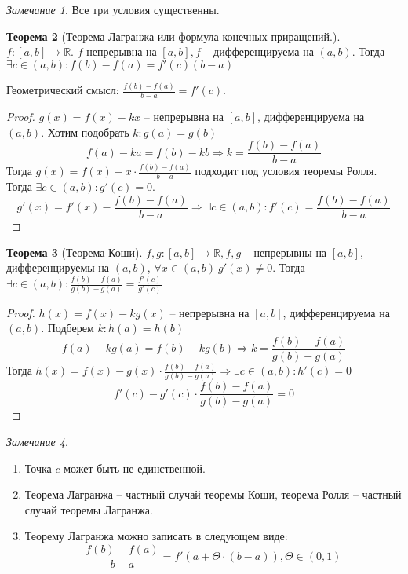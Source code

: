 \documentclass[12pt]{article}
\newenvironment{MyList}[1][4pt]{
  \begin{enumerate}[1.]
  \setlength{\parskip}{0pt}
  \setlength{\itemsep}{#1}
}{       
  \end{enumerate}
}
\def\R{\mathbb{R}}       %
\def\SO{\Rightarrow}     %
\theoremstyle{definition} %
\newtheorem{Thm}{\underline{Теорема}}[subsection] %
\theoremstyle{plain} %
\theoremstyle{remark} %
\newtheorem{Rem}[Thm]{Замечание} %
\begin{document}
\begin{Rem}
    Все три условия существенны.
\end{Rem}

\begin{Thm}[Теорема Лагранжа или формула конечных приращений.]
    $f : [a, b] \to \R$. $f$ непрерывна на $[a, b], f$ -- дифференцируема на $(a, b)$.
    Тогда $\exists c \in (a, b) : f(b) - f(a) = f'(c)(b - a)$ 

    Геометрический смысл: $ \frac{f(b) - f(a)}{b - a} = f'(c)$.
    
    \begin{figure*}[h]
        \centering
        \def\svgwidth{0.4\columnwidth} 
        
        \caption{Теорема Лагранжа}
    \end{figure*}
\end{Thm}

\begin{proof}
    $g(x) = f(x) - kx$ -- непрерывна на $[a, b]$, дифференцируема на $(a, b)$. Хотим подобрать $k : g(a) = g(b)$
    \[f(a) - ka = f(b) - kb \SO k = \frac{f(b) - f(a)}{b - a}\]
    Тогда $g(x) = f(x) - x \cdot \frac{f(b) - f(a)}{b - a}$ подходит под условия теоремы Ролля.
    Тогда $\exists c \in (a, b) : g'(c) = 0$.
    \[g'(x) = f'(x) - \frac{f(b) - f(a)}{b - a} \SO \exists c \in (a, b) : f'(c) = \frac{f(b) - f(a)}{b - a}\]  
\end{proof}

\begin{Thm}[Теорема Коши]
    $f, g : [a, b] \to \R, f, g$ -- непрерывны на $[a, b]$, дифференцируемы на $(a, b)$, $\forall x \in (a, b) \ g'(x) \neq 0$.
    Тогда $\exists c \in (a, b) : \frac{f(b) - f(a)}{g(b) - g(a)} = \frac{f'(c)}{g'(c)}$    
\end{Thm}

\begin{proof}
    $h(x) = f(x) - kg(x)$ -- непрерывна на $[a, b]$, дифференцируема на $(a, b)$. 
    Подберем $k : h(a) = h(b)$ 
    \[f(a) - kg(a) = f(b) - kg(b) \SO k = \frac{f(b) - f(a)}{g(b) - g(a)}\]
    Тогда $h(x) = f(x) - g(x) \cdot \frac{f(b) - f(a)}{g(b) - g(a)} \SO \exists c \in (a, b) : h'(c) = 0$
    \[f'(c) - g'(c) \cdot \frac{f(b) - f(a)}{g(b) - g(a)} = 0\] 
\end{proof}

\begin{Rem}
    \begin{MyList}
        \item Точка $c$ может быть не единственной.
        \item Теорема Лагранжа -- частный случай теоремы Коши, теорема Ролля -- частный случай теоремы Лагранжа.
        \item Теорему Лагранжа можно записать в следующем виде:
        \[ \frac{f(b) - f(a)}{b - a} = f'(a + \Theta \cdot (b - a)), \Theta \in (0, 1)\]
    \end{MyList}
\end{Rem}
\end{document}
